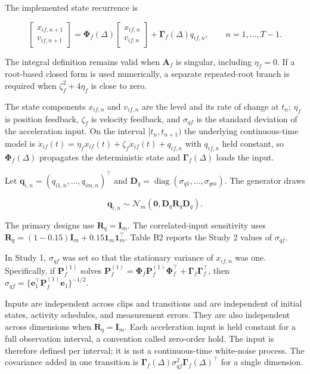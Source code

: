 \documentclass[
]{article}
\begin{document}
The implemented state recurrence is

\[
\begin{bmatrix}
x_{if,n+1}\\
v_{if,n+1}
\end{bmatrix}
=
\boldsymbol{\Phi}_f(\Delta)
\begin{bmatrix}
x_{if,n}\\
v_{if,n}
\end{bmatrix}
+
\boldsymbol{\Gamma}_f(\Delta)q_{if,n},
\qquad n=1,\ldots,T-1.
\]

The integral definition remains valid when \(\mathbf{A}_f\) is singular,
including \(\eta_f=0\). If a root-based closed form is used numerically,
a separate repeated-root branch is required when \(\zeta_f^2+4\eta_f\)
is close to zero.

The state components \(x_{if,n}\) and \(v_{if,n}\) are the level and its
rate of change at \(t_n\); \(\eta_f\) is position feedback, \(\zeta_f\)
is velocity feedback, and \(\sigma_{qf}\) is the standard deviation of
the acceleration input. On the interval \([t_n,t_{n+1})\) the underlying
continuous-time model is
\(\ddot{x}_{if}(t)=\eta_f x_{if}(t)+\zeta_f\dot{x}_{if}(t)+q_{if,n}\)
with \(q_{if,n}\) held constant, so \(\boldsymbol{\Phi}_f(\Delta)\)
propagates the deterministic state and \(\boldsymbol{\Gamma}_f(\Delta)\)
loads the input.

Let \(\mathbf q_{i,n}=(q_{i1,n},\ldots,q_{im,n})^\top\) and
\(\mathbf D_q=\operatorname{diag}(\sigma_{q1},\ldots,\sigma_{qm})\). The
generator draws

\[
\mathbf q_{i,n}\sim
\mathcal N_m\!\left(\mathbf 0,\mathbf D_q\mathbf R_q\mathbf D_q\right).
\]

The primary designs use \(\mathbf R_q=\mathbf I_m\). The
correlated-input sensitivity uses
\(\mathbf R_q=(1-0.15)\mathbf I_m+0.15\mathbf 1_m\mathbf 1_m^\top\).
Table B2 reports the Study 2 values of \(\sigma_{qf}\).

In Study 1, \(\sigma_{qf}\) was set so that the stationary variance of
\(x_{if,n}\) was one. Specifically, if \(\mathbf P_f^{(1)}\) solves
\(\mathbf P_f^{(1)}=\boldsymbol\Phi_f\mathbf P_f^{(1)}\boldsymbol\Phi_f^\top+\boldsymbol\Gamma_f\boldsymbol\Gamma_f^\top\),
then
\(\sigma_{qf}=\{\mathbf e_1^\top\mathbf P_f^{(1)}\mathbf e_1\}^{-1/2}\).

Inputs are independent across clips and transitions and are independent
of initial states, activity schedules, and measurement errors. They are
also independent across dimensions when \(\mathbf R_q=\mathbf I_m\).
Each acceleration input is held constant for a full observation
interval, a convention called zero-order hold. The input is therefore
defined per interval; it is not a continuous-time white-noise process.
The covariance added in one transition is
\(\boldsymbol{\Gamma}_f(\Delta)\sigma_{qf}^{2}\boldsymbol{\Gamma}_f(\Delta)^\top\)
for a single dimension.
\end{document}
